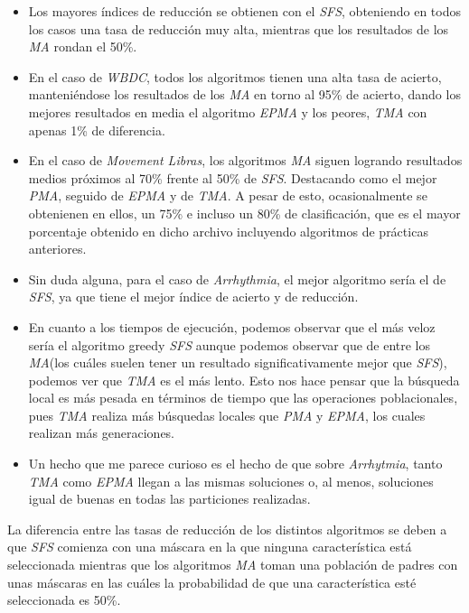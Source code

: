 \documentclass[a4paper, 11pt]{article}
\begin{document}
			\begin{itemize}
				\item Los mayores índices de reducción se obtienen con el \textit{SFS}, obteniendo en
				todos los casos una tasa de reducción muy alta, mientras que los resultados de los
				\textit{MA} rondan el 50\%.
				
				\item En el caso de \textit{WBDC}, todos los algoritmos tienen una alta tasa de acierto,
				manteniéndose los resultados de los \textit{MA} en torno al 95\% de acierto, dando los
				mejores resultados en media el algoritmo \textit{EPMA} y los peores, \textit{TMA} con
				apenas 1\% de diferencia.
				
				\item En el caso de \textit{Movement Libras}, los algoritmos \textit{MA} siguen logrando
				resultados medios próximos al 70\% frente al 50\% de \textit{SFS}. Destacando como el
				mejor \textit{PMA}, seguido de \textit{EPMA} y de \textit{TMA}. A pesar de esto,
				ocasionalmente se obtenienen en ellos, un 75\% e incluso un 80\% de clasificación, que
				es el mayor porcentaje obtenido en dicho archivo incluyendo algoritmos de prácticas
				anteriores.
				
				\item Sin duda alguna, para el caso de \textit{Arrhythmia}, el mejor algoritmo sería
				el de \textit{SFS}, ya que tiene el mejor índice de acierto y de reducción.
				
				\item En cuanto a los tiempos de ejecución, podemos observar que el más veloz sería el
				algoritmo greedy \textit{SFS} aunque podemos observar que de entre los \textit{MA}(los
				cuáles suelen tener un resultado significativamente mejor que \textit{SFS}), podemos
				ver que \textit{TMA} es el más lento. Esto nos hace pensar que la búsqueda local es
				más pesada en términos de tiempo que las operaciones poblacionales, pues \textit{TMA}
				realiza más búsquedas locales que \textit{PMA} y \textit{EPMA}, los cuales realizan
				más generaciones.
				
				\item Un hecho que me parece curioso es el hecho de que sobre \textit{Arrhytmia}, tanto
				\textit{TMA} como \textit{EPMA} llegan a las mismas soluciones o, al menos, soluciones
				igual de buenas en todas las particiones realizadas.
			\end{itemize}
			
			La diferencia entre las tasas de reducción de los distintos algoritmos se deben a que \textit{SFS}
			comienza con una máscara en la que ninguna característica está seleccionada mientras que
			los algoritmos \textit{MA} toman una población de padres con unas máscaras en las cuáles
			la probabilidad de que una característica esté seleccionada es 50\%.
			
\end{document}
